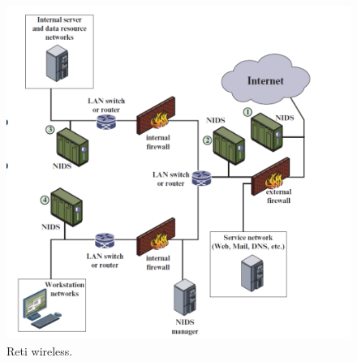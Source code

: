 \begin{figure}[h]
    \centering
    \includegraphics[width=1\textwidth]{images/chapter7/7-7.png}
    \caption{Reti wireless.}
    \label{fig:7-7}
\end{figure}